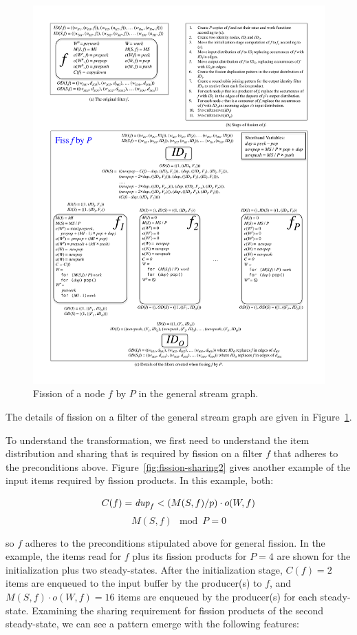 \begin{figure}
\centering
\includegraphics[width=\textwidth]{figures/general-fission.pdf}
\caption[Fission of a node in the general stream graph.]{Fission of a
  node $f$ by $P$ in the general stream
  graph.\label{fig:general-fission}}
\end{figure}

The details of fission on a filter of the general stream graph are
given in Figure~\ref{fig:general-fission}. 

To understand the transformation, we first need to understand the item
distribution and sharing that is required by fission on a filter $f$
that adheres to the preconditions above.
Figure~\ref{fig:fission-sharing2} gives another example of the input
items required by fission products.  In this example, both:

\[ C(f) = \mbox{\it dup}_f < (M(S,f) / p) \cdot o(W, f) \]
\[ M(S, f) \mod P = 0\]

\noindent so $f$ adheres to the preconditions stipulated above for
general fission.  In the example, the items read for $f$ plus its
fission products for $P=4$ are shown for the initialization plus two
steady-states.  After the initialization stage, $C(f) = 2$ items are
enqueued to the input buffer by the producer(s) to $f$, and $M(S,f)
\cdot o(W, f) = 16$ items are enqueued by the producer(s) for each
steady-state.  Examining the sharing requirement for fission products of
the second steady-state, we can see a pattern emerge with the following
features:

